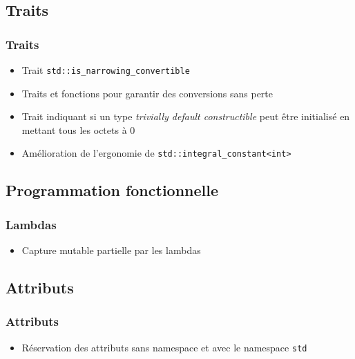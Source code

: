 \documentclass[C++.tex]{subfiles}
\begin{document}
\subsection*{Traits}
\begin{frame}[fragile]
	\frametitle{Traits}
	\begin{itemize}
		\item Trait \lstinline|std::is_narrowing_convertible|
		\item Traits et fonctions pour garantir des conversions sans perte
		\item Trait indiquant si un type \textit{trivially default constructible} peut être initialisé en mettant tous les octets à 0
		\item Amélioration de l'ergonomie de \lstinline|std::integral_constant<int>|
	\end{itemize}
\end{frame}

\subsection*{Programmation fonctionnelle}
\begin{frame}[fragile]
	\frametitle{Lambdas}
	\begin{itemize}
		\item Capture mutable partielle par les lambdas

	\end{itemize}
\end{frame}

\subsection*{Attributs}
\begin{frame}[fragile]
	\frametitle{Attributs}
	\begin{itemize}
		\item Réservation des attributs sans namespace et avec le namespace \lstinline|std|

	\end{itemize}
\end{frame}
\end{document}
